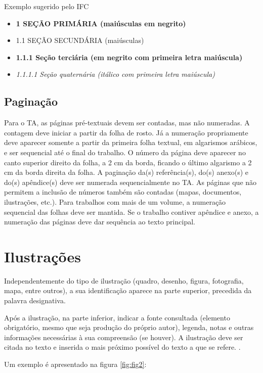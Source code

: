 Exemplo sugerido pelo IFC
\begin{itemize}
\item[] \textbf{1  SEÇÃO PRIMÁRIA (maiúsculas em negrito)}
\item[] 1.1  SEÇÃO SECUNDÁRIA (maiúsculas)
\item[] \textbf{1.1.1   Seção terciária (em negrito com primeira letra maiúscula)}
\item[] \textit{1.1.1.1 Seção quaternária (itálico com primeira letra maiúscula)}
\end{itemize}


\subsection{Paginação}
Para o TA, as páginas pré-textuais devem ser contadas, mas não numeradas. A contagem deve iniciar a partir da folha de rosto. Já a numeração propriamente deve aparecer somente a partir da primeira folha textual, em algarismos arábicos, e ser sequencial até o final do trabalho. 
O número da página deve aparecer no canto superior direito da folha, a 2 cm da borda, ficando o último algarismo a 2 cm da borda direita da folha.
A paginação da(s) referência(s), do(s) anexo(s) e do(s) apêndice(s) deve ser numerada sequencialmente no TA. As páginas que não permitem a inclusão de números também são contadas (mapas, documentos, ilustrações, etc.).
Para trabalhos com mais de um volume, a numeração sequencial das folhas deve ser mantida. Se o trabalho contiver apêndice e anexo, a numeração das páginas deve dar sequência ao texto principal.

\section{Ilustrações}
Independentemente do tipo de ilustração (quadro, desenho, figura, fotografia, mapa, entre outros), a sua identificação aparece na parte superior, precedida da palavra designativa. 
\begin{citacao}
Após a ilustração, na parte inferior, indicar a fonte consultada (elemento obrigatório, mesmo que seja produção do próprio autor), legenda, notas e outras informações necessárias à sua compreensão (se houver). A ilustração deve ser citada no texto e inserida o mais próximo possível do texto a que se refere. \cite[p. 11]{abnt14724}.
\end{citacao}

Um exemplo é apresentado na figura \ref{fig:fig2}:



